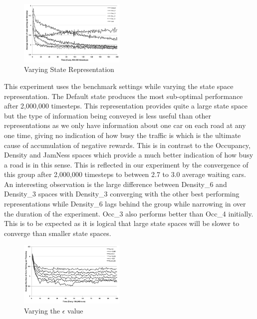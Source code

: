 \begin{description}
\begin{figure}
\centering
\includegraphics[width=0.45\textwidth]{states}
\caption{Varying State Representation}\label{f:states}
\end{figure}

\item[Fig.~\ref{f:states}]
This experiment uses the benchmark settings while varying the state space representation. The Default state produces the most sub-optimal performance after 2,000,000 timesteps. This representation provides quite a large state space but the type of information being conveyed is less useful than other representations as we only have information about one car on each road at any one time, giving no indication of how busy the traffic is which is the ultimate cause of accumulation of negative rewards. This is in contrast to the Occupancy, Density and JamNess spaces which provide a much better indication of how busy a road is in this sense. This is reflected in our experiment by the convergence of this group after 2,000,000 timesteps to between 2.7 to 3.0 average waiting cars. An interesting observation is the large difference between Density\_6 and Density\_3 spaces with Density\_3 converging with the other best performing representations while Density\_6 lags behind the group while narrowing in over the duration of the experiment. Occ\_3 also performs better than Occ\_4 initially. This is to be expected as it is logical that large state spaces will be slower to converge than smaller state spaces.

\begin{figure}
\centering
\includegraphics[width=0.45\textwidth]{epsilon}
\caption{Varying the $\epsilon $ value}\label{f:epsilon}
\end{figure}


\end{description}

